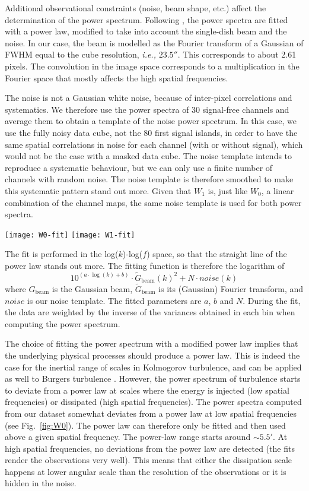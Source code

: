 \documentclass[structabstract]{aa}
\newcommand{\ie}{{\em i.e.,}}
\newcommand{\eg}{{\em e.g.,}}
\newcommand{\emm}[1]{\ensuremath{#1}}
\newcommand{\emr}[1]{\emm{\mathrm{#1}}}
\newcommand{\FigWzero}{%
  \begin{figure*}
    \centering
    \texttt{[image: W0-fit]}
    \texttt{[image: W1-fit]}
    \caption{Left: Power law fitting of the $W_0$ power spectrum. Upper panel: data (blue crosses), fit result (thick solid line) plotted over the fitted domain, power law convolved with the Gaussian beam (dotted line) extrapolated to all spatial frequencies, noise model (dashed line). Lower panel, residuals. The scale in the Fourier space is given in UV distance as for interferometric observations, which allows to visually relate the resolution and the telescope diameter. Right: Same results, except for the $W_1$ power spectrum.}
    \label{fig:W0}
  \end{figure*}}
\begin{document}
Additional observational constraints (noise, beam shape, etc.) affect the determination of the power spectrum. Following \citet{martin15}, the power spectra are fitted with a power law, modified to take into account the single-dish beam and the noise. In our case, the beam is modelled as the Fourier transform of a Gaussian of FWHM equal to the cube resolution, \ie{} $23.5''$. This corresponds to about 2.61 pixels. The convolution in the image space corresponds to a multiplication in the Fourier space that mostly affects the high spatial frequencies.

The noise is not a Gaussian white noise, because of inter-pixel correlations and systematics. We therefore use the power spectra of 30 signal-free channels and average them to obtain a template of the noise power spectrum. In this case, we use the fully noisy data cube, not the 80 first signal islands, in order to have the same spatial correlations in noise for each channel (with or without signal), which would not be the case with a masked data cube. The noise template intends to reproduce a systematic behaviour, but we can only use a finite number of channels with random noise. The noise template is therefore smoothed to make this systematic pattern stand out more. Given that $W_1$ is, just like $W_0$, a linear combination of the channel maps, the same noise template is used for both power spectra.

\FigWzero

The fit is performed in the log($k$)-log($f$) space, so that the straight line of the power law stands out more. The fitting function is therefore the logarithm of
\begin{equation}
  10^{\left(a\cdot\log(k) + b\right)}\cdot \tilde{G}_\emr{beam}(k)^2 + N\cdot noise(k)
\end{equation}
where $G_\emr{beam}$ is the Gaussian beam, $\tilde{G}_\emr{beam}$ is its (Gaussian) Fourier transform, and $noise$ is our noise template. The fitted parameters are $a$, $b$ and $N$. During the fit, the data are weighted by the inverse of the variances obtained in each bin when computing the power spectrum. 

The choice of fitting the power spectrum with a modified power law implies that the underlying physical processes should produce a power law. This is indeed the case for the inertial range of scales in Kolmogorov turbulence, and can be applied as well to Burgers turbulence \citep[see, \eg{}][]{federrath13b}. However, the power spectrum of turbulence starts to deviate from a power law at scales where the energy is injected (low spatial frequencies) or dissipated (high spatial frequencies). The power spectra computed from our dataset somewhat deviates from a power law at low spatial frequencies (see Fig.~\ref{fig:W0}). The power law can therefore only be fitted and then used above a given spatial frequency. The power-law range starts around $\sim 5.5'$. At high spatial frequencies, no deviations from the power law are detected (the fits render the observations very well). This means that either the dissipation scale happens at lower angular scale than the resolution of the observations or it is hidden in the noise.
\\
\end{document}
